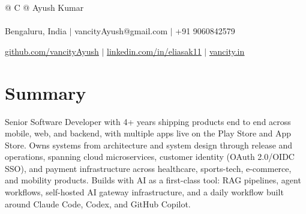 \documentclass[a4paper,8pt]{article}
\begin{document}
\pagestyle{empty}


\begin{tabularx}{\linewidth}{@{} C @{}}
\color[HTML]{1C033C} \Huge{Ayush Kumar} \\[6pt]
\\
\textcolor[HTML]{371e77}{{{{\faMapMarker} Bengaluru, India}} $|$}
\textcolor[HTML]{371e77}{{{{\faEnvelope} vancityAyush@gmail.com}} $|$}
\textcolor[HTML]{371e77}{{{\faMobile} +91 9060842579}}

\textcolor[HTML]{371e77}{\underline{\href{https://github.com/vancityAyush}{\raisebox{-0.05\height}{\faGithub} github.com/vancityAyush}} $|$}
\textcolor[HTML]{371e77}{\underline{\href{https://linkedin.com/in/eliasak11}{\raisebox{-0.05\height}{\faLinkedin} linkedin.com/in/eliasak11}} $|$}
\textcolor[HTML]{371e77}{\underline{\href{https://vancity.in}{\raisebox{-0.05\height}{\faGlobe} vancity.in}}}
\end{tabularx}

\section{Summary}
\color[HTML]{1C033C}Senior Software Developer with 4+ years shipping products end to end across mobile, web, and backend, with multiple apps live on the Play Store and App Store. Owns systems from architecture and system design through release and operations, spanning cloud microservices, customer identity (OAuth 2.0/OIDC SSO), and payment infrastructure across healthcare, sports-tech, e-commerce, and mobility products. Builds with AI as a first-class tool: RAG pipelines, agent workflows, self-hosted AI gateway infrastructure, and a daily workflow built around Claude Code, Codex, and GitHub Copilot.\\[3pt]
\end{document}
